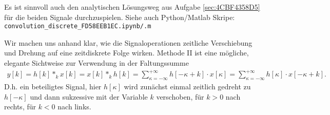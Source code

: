 %
Es ist sinnvoll auch den analytischen Lösungsweg aus Aufgabe \ref{sec:4CBF4358D5}
für die beiden Signale durchzuspielen.
Siehe auch Python/Matlab Skripe: \texttt{convolution\_discrete\_FD58EEB1EC.ipynb/.m}
\begin{Werkzeug}
Wir machen uns anhand  klar, wie die Signaloperationen
zeitliche Verschiebung und Drehung auf eine zeitdiskrete Folge wirken. Methode II
ist eine mögliche, elegante Sichtweise zur Verwendung in der Faltungssumme
\begin{align}
y[k]
= h[k] \ast_k x[k]
= x[k] \ast_k h[k]
= \sum_{\kappa=-\infty}^{+\infty} h[-\kappa + k] \cdot x[\kappa]
= \sum_{\kappa=-\infty}^{+\infty} h[\kappa] \cdot x[-\kappa + k].
\end{align}
D.h. ein beteiligtes Signal,
hier $h[\kappa]$ wird zunächst einmal zeitlich gedreht zu $h[-\kappa]$ und
dann sukzessive mit der Variable $k$ verschoben, für $k>0$ nach rechts, für
$k<0$ nach links.
\end{Werkzeug}
%
